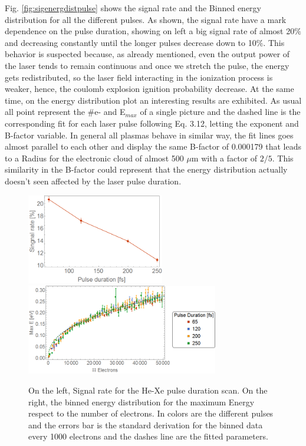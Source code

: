 Fig. \ref{fig:sigenergdistpulse} shows the signal rate and the Binned energy distribution for all the different pulses. As shown, the signal rate have a mark dependence on the  pulse duration, showing on left a big signal rate of almost 20$\%$  and decreasing constantly until  the longer pulses decrease down to  10$\%$.  This behavior is suspected because, as already mentioned, even the output power of the laser tends to remain continuous and once we stretch the pulse, the energy gets redistributed, so the laser field interacting in the ionization process is weaker, hence, the coulomb explosion ignition probability decrease. At the same time, on the energy distribution plot an interesting results are exhibited.  As usual all point represent the $\#$e- and E$_{max}$ of a single picture and the dashed line is the corresponding fit for each laser pulse following Eq. 3.12, letting the exponent and B-factor variable. In general all  plasmas behave in similar way, the fit lines goes almost parallel to each other and display the same B-factor  of 0.000179 that leads to a Radius for the electronic cloud of almost 500 $\mu$m with a factor of $2/5$. This similarity in the B-factor could represent that the energy distribution actually doesn’t seen affected by the laser pulse duration.



\begin{figure}[h!]
\centering

\hspace*{\fill}
{ \includegraphics[width=6cm]{../Images/results/MIR_He_pulsescan/raw/signalrate.png}} \hfill {\includegraphics[width=8.4cm]{../Images/results/MIR_He_pulsescan/raw/binned.png}}
\hspace*{\fill}
\caption[MIR He pulse scan. Signal rate and Energy distribution]{On the left, Signal rate for the He-Xe  pulse duration scan. On the right, the binned energy distribution for the maximum Energy respect to the number of electrons. In colors are the different pulses and the errors bar is the standard derivation for the binned data every 1000 electrons and the dashes line are the fitted parameters.}
\label{fig:mult1}
\end{figure}

